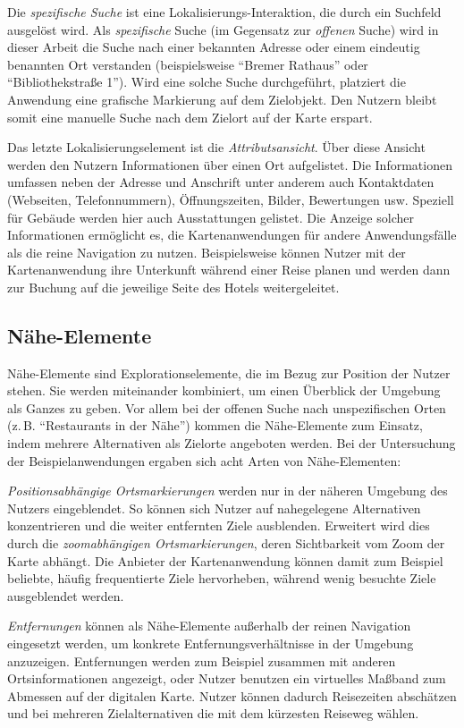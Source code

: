 Die \emph{spezifische Suche} ist eine Lokalisierungs-Interaktion, die durch ein Suchfeld ausgelöst wird.
Als \emph{spezifische} Suche (im Gegensatz zur \emph{offenen} Suche) wird in dieser Arbeit die Suche nach einer bekannten Adresse oder einem eindeutig benannten Ort verstanden (beispielsweise \enquote{Bremer Rathaus} oder \enquote{Bibliothekstraße 1}).
Wird eine solche Suche durchgeführt, platziert die Anwendung eine grafische Markierung auf dem Zielobjekt.
Den Nutzern bleibt somit eine manuelle Suche nach dem Zielort auf der Karte erspart.

Das letzte Lokalisierungselement ist die \emph{Attributsansicht}.
Über diese Ansicht werden den Nutzern Informationen über einen Ort aufgelistet.
Die Informationen umfassen neben der Adresse und Anschrift unter anderem auch Kontaktdaten (Webseiten, Telefonnummern), Öffnungszeiten, Bilder, Bewertungen usw.
Speziell für Gebäude werden hier auch Ausstattungen gelistet.
Die Anzeige solcher Informationen ermöglicht es, die Kartenanwendungen für andere Anwendungsfälle als die reine Navigation zu nutzen.
Beispielsweise können Nutzer mit der Kartenanwendung ihre Unterkunft während einer Reise planen und werden dann zur Buchung auf die jeweilige Seite des Hotels weitergeleitet.

\subsection{Nähe-Elemente}
\label{ssec:prox-elements}
Nähe-Elemente sind Explorationselemente, die im Bezug zur Position der Nutzer stehen.
Sie werden miteinander kombiniert, um einen Überblick der Umgebung als Ganzes zu geben.
Vor allem bei der offenen Suche nach unspezifischen Orten (z.\,B. \enquote{Restaurants in der Nähe}) kommen die Nähe-Elemente zum Einsatz, indem mehrere Alternativen als Zielorte angeboten werden.
Bei der Untersuchung der Beispielanwendungen ergaben sich acht Arten von Nähe-Elementen:

\emph{Positionsabhängige Ortsmarkierungen} werden nur in der näheren Umgebung des Nutzers eingeblendet.
So können sich Nutzer auf nahegelegene Alternativen konzentrieren und die weiter entfernten Ziele ausblenden.
Erweitert wird dies durch die \emph{zoomabhängigen Ortsmarkierungen}, deren Sichtbarkeit vom Zoom der Karte abhängt.
Die Anbieter der Kartenanwendung können damit zum Beispiel beliebte, häufig frequentierte Ziele hervorheben, während wenig besuchte Ziele ausgeblendet werden.

\emph{Entfernungen} können als Nähe-Elemente außerhalb der reinen Navigation eingesetzt werden, um konkrete Entfernungsverhältnisse in der Umgebung anzuzeigen.
Entfernungen werden zum Beispiel zusammen mit anderen Ortsinformationen angezeigt, oder Nutzer benutzen ein virtuelles Maßband zum Abmessen auf der digitalen Karte.
Nutzer können dadurch Reisezeiten abschätzen und bei mehreren Zielalternativen die mit dem kürzesten Reiseweg wählen.

